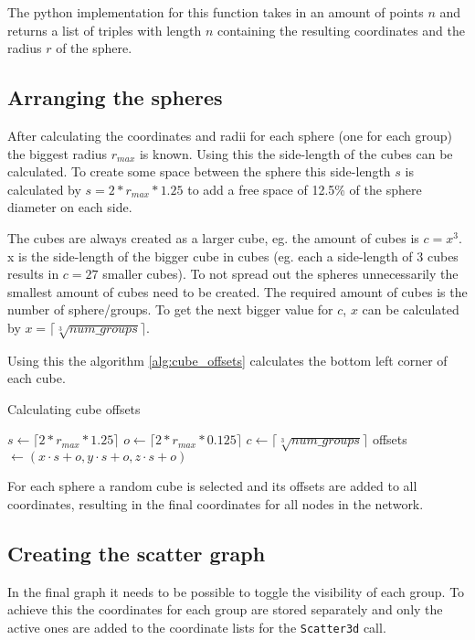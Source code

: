 The python implementation for this function takes in an amount of points $n$ and returns a list of triples with length $n$ containing the resulting coordinates and the radius $r$ of the sphere.

\subsection{Arranging the spheres}
After calculating the coordinates and radii for each sphere (one for each group) the biggest radius $r_{max}$ is known. Using this the side-length of the cubes can be calculated. To create some space between the sphere this side-length $s$ is calculated by $s = 2 * r_{max} * 1.25$ to add a free space of 12.5\% of the sphere diameter on each side.

The cubes are always created as a larger cube, eg. the amount of cubes is $c = x^3$. x is the side-length of the bigger cube in cubes (eg. each a side-length of 3 cubes results in $c=27$ smaller cubes). To not spread out the spheres unnecessarily the smallest amount of cubes need to be created. The required amount of cubes is the number of sphere/groups. To get the next bigger value for $c$, $x$ can be calculated by $x =\lceil\sqrt[3]{num\_groups}\rceil$.

Using this the algorithm \ref{alg:cube_offsets} calculates the bottom left corner of each cube.

\begin{algorithm}
\caption{Calculating cube offsets}
\label{alg:cube_offsets}
\begin{algorithmic}
\State $s \gets \lceil 2 * r_{max} * 1.25\rceil$
\State $o \gets \lceil 2 * r_{max} * 0.125\rceil$
\State $c \gets \lceil\sqrt[3]{num\_groups}\rceil$
    \State offsets $\gets (x \cdot s + o, y \cdot s + o, z \cdot s + o)$
\EndFor
\end{algorithmic}
\end{algorithm}

For each sphere a random cube is selected and its offsets are added to all coordinates, resulting in the final coordinates for all nodes in the network.

\subsection{Creating the scatter graph}
\label{sub:scatter_graph}
In the final graph it needs to be possible to toggle the visibility of each group. To achieve this the coordinates for each group are stored separately and only the active ones are added to the coordinate lists for the \texttt{Scatter3d} call.

